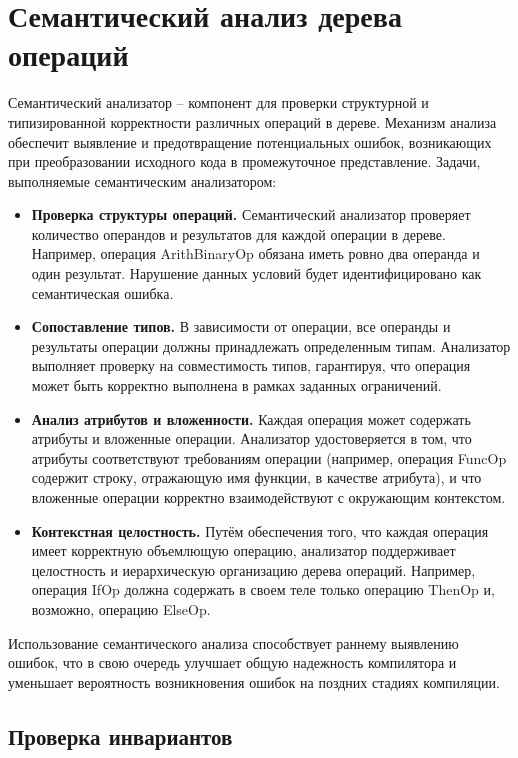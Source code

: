 \newpage
\section{Семантический анализ дерева операций}
\label{sec:semantizer}

Семантический анализатор -- компонент для проверки структурной и типизированной корректности различных операций в дереве.
Механизм анализа обеспечит выявление и предотвращение потенциальных ошибок, возникающих при преобразовании исходного кода в промежуточное представление.
Задачи, выполняемые семантическим анализатором:

\begin{itemize}
    \item \textbf{Проверка структуры операций.} Семантический анализатор проверяет количество операндов и результатов для каждой операции в дереве. Например, операция ArithBinaryOp обязана иметь ровно два операнда и один результат. Нарушение данных условий будет идентифицировано как семантическая ошибка.
    \item \textbf{Сопоставление типов.} В зависимости от операции, все операнды и результаты операции должны принадлежать определенным типам. Анализатор выполняет проверку на совместимость типов, гарантируя, что операция может быть корректно выполнена в рамках заданных ограничений.
    \item \textbf{Анализ атрибутов и вложенности.} Каждая операция может содержать атрибуты и вложенные операции. Анализатор удостоверяется в том, что атрибуты соответствуют требованиям операции (например, операция FuncOp содержит строку, отражающую имя функции, в качестве атрибута), и что вложенные операции корректно взаимодействуют с окружающим контекстом.
    \item \textbf{Контекстная целостность.} Путём обеспечения того, что каждая операция имеет корректную объемлющую операцию, анализатор поддерживает целостность и иерархическую организацию дерева операций. Например, операция IfOp должна содержать в своем теле только операцию ThenOp и, возможно, операцию ElseOp.
\end{itemize}

Использование семантического анализа способствует раннему выявлению ошибок, что в свою очередь улучшает общую надежность компилятора и уменьшает вероятность возникновения ошибок на поздних стадиях компиляции.

\subsection{Проверка инвариантов}

